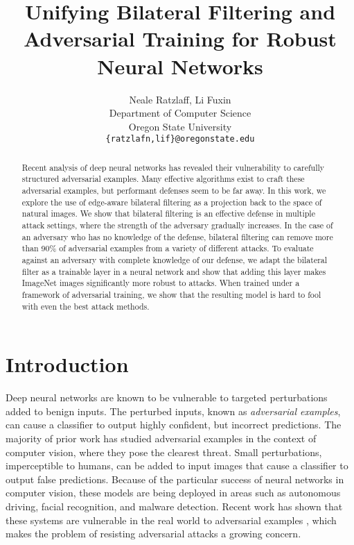 \documentclass{article} %
\title{Unifying Bilateral Filtering and Adversarial Training for Robust Neural Networks}
\author{Neale Ratzlaff,  Li Fuxin \\
Department of Computer Science\\
Oregon State University\\
\texttt{\{ratzlafn,lif\}@oregonstate.edu} \\
}
\begin{document}
\maketitle
\begin{abstract}
Recent analysis of deep neural networks has revealed their vulnerability to carefully structured adversarial examples. Many effective algorithms exist to craft these adversarial examples, but performant defenses seem to be far away. In this work, we explore the use of edge-aware bilateral filtering as a projection back to the space of natural images. We show that bilateral filtering is an effective defense in multiple attack settings, where the strength of the adversary gradually increases. In the case of an adversary who has no knowledge of the defense, bilateral filtering can remove more than 90\% of adversarial examples from a variety of different attacks. To evaluate against an adversary with complete knowledge of our defense, we adapt the bilateral filter as a trainable layer in a neural network and show that adding this layer makes ImageNet images significantly more robust to attacks. When trained under a framework of adversarial training, we show that the resulting model is hard to fool with even the best attack methods. 
\end{abstract}

\section{Introduction}

Deep neural networks are known to be vulnerable to targeted perturbations added to benign inputs. The perturbed inputs, known as \textit{adversarial examples}, can cause a classifier to output highly confident, but incorrect predictions. %
The majority of prior work has studied adversarial examples in the context of computer vision, where they pose the clearest threat. Small perturbations, imperceptible to humans, can be added to input images that cause a classifier to output false predictions. Because of the particular success of neural networks in computer vision, these models are being deployed in areas such as autonomous driving, facial recognition, and malware detection. Recent work has shown that these systems are vulnerable in the real world to adversarial examples \citep{evtimov2017robust}, which makes the problem of resisting adversarial attacks a growing concern. 
\end{document}

